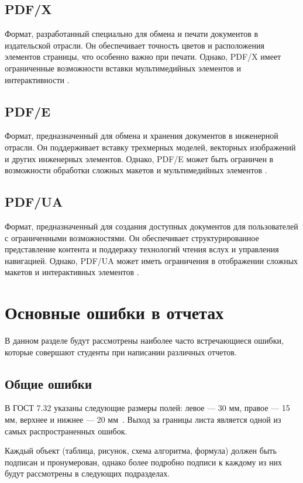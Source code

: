 \subsection{PDF/X}
Формат, разработанный специально для обмена и печати документов в издательской отрасли. Он обеспечивает точность цветов и расположения элементов страницы, что особенно важно при печати. Однако, PDF/X имеет ограниченные возможности вставки мультимедийных элементов и интерактивности \cite{abdobe_PDF}.


\subsection{PDF/E}
Формат, предназначенный для обмена и хранения документов в инженерной отрасли. Он поддерживает вставку трехмерных моделей, векторных изображений и других инженерных элементов. Однако, PDF/E может быть ограничен в возможности обработки сложных макетов и мультимедийных элементов \cite{abdobe_PDF}.
\subsection{PDF/UA}
Формат, предназначенный для создания доступных документов для пользователей с ограниченными возможностями. Он обеспечивает структурированное представление контента и поддержку технологий чтения вслух и управления навигацией. Однако, PDF/UA может иметь ограничения в отображении сложных макетов и интерактивных элементов \cite{abdobe_PDF}.






\section{Основные ошибки в отчетах}
В данном разделе будут рассмотрены наиболее часто встречающиеся ошибки, которые совершают студенты при написании различных отчетов.

\subsection{Общие ошибки}
В ГОСТ 7.32 указаны следующие размеры полей: левое --- 30 мм, правое --- 15 мм, верхнее и нижнее --- 20 мм~\cite{GOST732}. Выход за границы листа является одной из самых распространенных ошибок.

Каждый объект (таблица, рисунок, схема алгоритма, формула) должен быть подписан и пронумерован, однако более подробно подписи к каждому из них будут рассмотрены в следующих подразделах.

